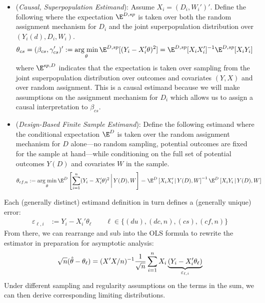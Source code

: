 \documentclass[12pt]{article}
\theoremstyle{plain}
\theoremstyle{definition}
\theoremstyle{remark}
\DeclareMathOperator*{\argmin}{arg\;min}
\newcommand{\sumin}{\sum^n_{i=1}}
\begin{document}
\begin{itemize}
  \item
    (\emph{Causal, Superpopulation Estimand}):
    Assume $X_i=(D_i,W_i')'$.
    Define the following where the expectation $\E^{D,sp}$ is taken over
    both the random assignment mechanism for $D_i$ and the joint
    superpopulation distribution over
    $(Y_i(d),D_i,W_i)$.
    \begin{align*}
      \theta_{cs}
      =
      (\beta_{cs},\gamma_{cs}')'
      &:=
      \argmin_{\theta}
      \E^{D,sp}[(Y_i-X_i'\theta)^2]
      =
      \E^{D,sp}[X_iX_i']^{-1}
      \E^{D,sp}[X_iY_i]
    \end{align*}
    where $\E^{sp,D}$ indicates that the expectation is taken over
    sampling from the joint superpopulation distribution over outcomes
    and covariates $(Y,X)$ and over random assignment.
    This is a causal estimand because we will make assumptions on the
    assignment mechanism for $D_i$ which allows us to assign a
    causal interpretation to $\beta_{cs}$.

  \clearpage
  \item
    (\emph{Design-Based Finite Sample Estimand}):
    Define the following estimand where the conditional expectation
    $\E^D$ is taken over the random assignment mechanism for $D$
    alone---no random sampling, potential outcomes are fixed for the
    sample at hand---while conditioning on the full set of potential
    outcomes $Y(D)$ and covariates $W$ in the sample.
    \begin{align*}
      \theta_{cf,n}
      &:=
      \argmin_{\theta}
      \E^D\left[
        \sum_{i=1}^n
        (Y_i-X_i'\theta)^2
        \,\bigg|\,Y(D),W
      \right]
      =
      \E^D
      \left[
      {X}_i{X}_i'
      \,|\,
      Y(D),W
      \right]^{-1}
      \E^D
      \left[
      {X}_iY_i
      \,|\,
      Y(D),W
      \right]
    \end{align*}
\end{itemize}
Each (generally distinct) estimand definition in turn defines a
(generally unique) error:
\begin{align*}
  \varepsilon_{\ell,i}
  &:=
  Y_i-X_i'\theta_{\ell}
  \qquad
  \ell\in\{(du), (dc,n), (cs), (cf,n)\}
\end{align*}
From there, we can rearrange and sub into the OLS formula to rewrite the
estimator in preparation for asymptotic analysis:
\begin{align*}
  \sqrt{n}
  (
  \hat{\theta}
  -
  \theta_{\ell}
  )
  =
  (X'X/n)^{-1}
  \frac{1}{\sqrt{n}}
  \sumin
  X_i
  \underbrace{%
    (Y_i-X_i'\theta_{\ell})
  }_{\varepsilon_{\ell,i}}
\end{align*}
Under different sampling and regularity assumptions on the terms in the
sum, we can then derive corresponding limiting distributions.
\end{document}
